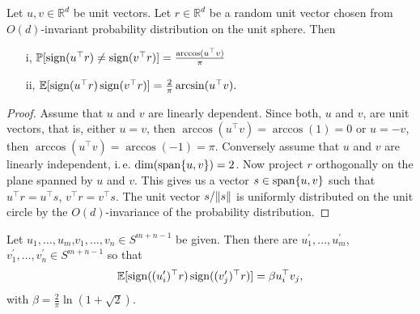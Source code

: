\begin{lemma}\label{lem:G_id}
	Let $u,v\in\mathbb{R}^d$ be unit vectors. Let $r\in\mathbb{R}^d$ be a random unit vector chosen from $O(d)$-invariant probability distribution on the unit sphere. Then
	\begin{enumerate}
		\item[i,] $\mathbb{P}[\operatorname{sign}(u^\top r)\neq\operatorname{sign}(v^\top r)]=\frac{\arccos(u^\top v)}{\pi}$
		\item[ii,] $\mathbb{E}[\operatorname{sign}(u^\top r)\operatorname{sign}(v^\top r)]=\frac{2}{\pi}\arcsin(u^\top v).$
	\end{enumerate}
\end{lemma}
\begin{proof}
	Assume that $u$ and $v$ are linearly dependent. Since both, $u$ and $v$, are unit vectors, that is, either $u=v$, then $\arccos(u^\top v) = \arccos(1)=0$ or $u=-v$, then $\arccos(u^\top v) = \arccos(-1) = \pi$.
	Conversely assume that $u$ and $v$ are linearly independent, i.\,e. $\operatorname{dim}(\operatorname{span}\{u,v\})=2$. Now project $r$ orthogonally on the plane spanned by $u$ and $v$. This gives us a vector $s\in \operatorname{span}\{u,v\}$ such that $u^\top r = u^\top s$, $v^\top r = v^\top s$. The unit vector $s/ \Vert {s} \Vert$ is uniformly distributed on the unit circle by the $O(d)$-invariance of the probability distribution. 
\end{proof}

\begin{lemma}\label{lem:krivines_trick}
	Let $u_1,\dots,u_m$,$v_1,\dots,v_n\in S^{m+n-1}$ be given. Then there are $u_1^\prime,\dots,u_m^\prime$,$v_1^\prime,\dots,v_n^\prime\in S^{m+n-1}$ so that
	\begin{equation}
		\mathbb{E}[\operatorname{sign}((u_i^\prime)^\top r)\operatorname{sign}((v_j^\prime)^\top r)] = \beta u_i^\top v_j,
	\end{equation}		
	with $\beta = \frac{2}{\pi} \ln (1+\sqrt{2}).$
\end{lemma}

